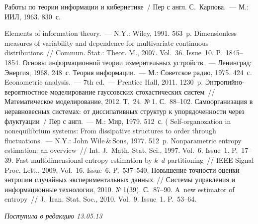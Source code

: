 \begin{multicols}{2}
{{\begin{thebibliography}{99}
   Работы по теории информации и кибернетике~/ Пер с англ.
  С.~Карпова.~--- М.:    ИИЛ, 1963. 830~с.
  
   Elements of information theory.~--- N.Y.: 
Wiley, 1991. 563~p.
   Dimensionless measures of variability and 
dependence for multivariate continuous distributions~// Commun. 
Stat.: Theor. M., 2007. Vol.~36. Issue~10. P.~1845--1854.
   Основы информационной теории измерительных 
устройств.~--- Ленинград: Энергия, 1968. 248~с.
   Теория информации.~--- М.: Советское радио, 
1975. 424~с.
   Econometric analysis.~--- 7th ed.~--- Prentice Hall, 2011. 1230~p.
   Энтро\-пий\-но-ве\-ро\-ят\-но\-ст\-ное 
моделирование гауссовских стохастических сис\-тем~// Математическое 
моделирование, 2012. Т.~24. №\,1. С.~88--102.
   Самоорганизация в неравновесных 
  сис\-те\-мах: от диссипативных структур к упорядоченности через 
флуктуации~/ Пер с англ.~--- М.: Мир, 1979. 512~с. (
Self-organozation in nonequilibrium systems: From dissipative structures to order through fluctuations.~---
N.Y.: John Wile\,\&\,Sons, 1977. 512~p.
Nonparametric entropy estimation: an overview~// Int. J.~Math. Stat. Sci., 1997. Vol.~6. Issue~1. P.~17--39.
   Fast multidimensional entropy estimation by 
  $k$--$d$ partitioning~// IEEE Signal Proc. Lett., 2009. Vol.~16. Issue~6. 
P.~537--540.
   Повышение точности оценки энтропии 
случайных экспериментальных данных~// Сис\-те\-мы управ\-ле\-ния и 
информационные технологии, 2010. №\,1(39). С.~87--90.
   A~new estimator of entropy~// J.~Iran. 
Stat. Soc., 2010. Vol.~9. Issue~1. P.~53--64.
  
 
  \end{thebibliography} } }
  



\end{multicols}

  \hfill{\small
\textit{Поступила в редакцию 13.05.13}}




